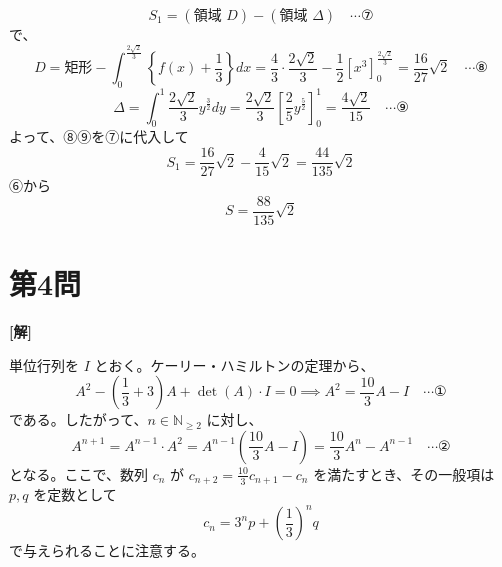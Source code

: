 \documentclass[../main.tex]{subfiles}
\begin{document}
\[
  S_1 = (\text{領域 } D) - (\text{領域 } \Delta) \quad \cdots \text{⑦}
\]
で、
\[
  D = \text{矩形} - \int_0^{\frac{2\sqrt{2}}{3}} \left\{ f(x) + \frac{1}{3} \right\} dx = \frac{4}{3} \cdot \frac{2\sqrt{2}}{3} - \frac{1}{2} \left[ x^3 \right]_0^{\frac{2\sqrt{2}}{3}} = \frac{16}{27}\sqrt{2} \quad \cdots \text{⑧}
\]
\[
  \Delta = \int_0^1 \frac{2\sqrt{2}}{3} y^{\frac{3}{2}} dy = \frac{2\sqrt{2}}{3} \left[ \frac{2}{5} y^{\frac{5}{2}} \right]_0^1 = \frac{4\sqrt{2}}{15} \quad \cdots \text{⑨}
\]
よって、⑧⑨を⑦に代入して
\[
  S_1 = \frac{16}{27}\sqrt{2} - \frac{4}{15}\sqrt{2} = \frac{44}{135}\sqrt{2}
\]
⑥から
\[
  S = \frac{88}{135}\sqrt{2}
\]

\newpage

\section*{第4問}

\noindent
\textbf{[解]}

単位行列を $I$ とおく。ケーリー・ハミルトンの定理から、
\[
  A^2 - \left(\frac{1}{3} + 3\right) A + \det(A) \cdot I = 0 \implies A^2 = \frac{10}{3}A - I \quad \cdots \text{①}
\]
である。したがって、$n \in \mathbb{N}_{\ge 2}$ に対し、
\[
  A^{n+1} = A^{n-1} \cdot A^2 = A^{n-1} \left( \frac{10}{3} A - I \right) = \frac{10}{3} A^n - A^{n-1} \quad \cdots \text{②}
\]
となる。ここで、数列 $c_n$ が $c_{n+2} = \frac{10}{3} c_{n+1} - c_n$ を満たすとき、その一般項は $p, q$ を定数として
\[
  c_n = 3^n p + \left(\frac{1}{3}\right)^n q
\]
で与えられることに注意する。
\end{document}
